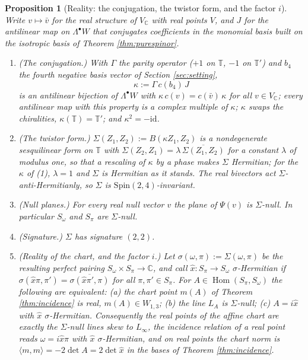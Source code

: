 \documentclass[11pt]{article}
\newtheorem{proposition}[theorem]{Proposition}
\theoremstyle{definition}
\newcommand{\C}{\mathbb{C}}
\newcommand{\T}{\mathbb{T}}
\newcommand{\id}{\mathrm{id}}
\newcommand{\ip}[2]{\langle #1, #2\rangle}
\newcommand{\Som}{S_\omega}
\newcommand{\Spi}{S_\pi}
\begin{document}
\begin{proposition}[Reality: the conjugation, the twistor form, and the factor $i$]\label{prop:reality}
Write $v \mapsto \bar v$ for the real structure of $V_\C$ with real points $V$, and $J$ for the antilinear map on $\Lambda^\bullet W$ that conjugates coefficients in the monomial basis built on the isotropic basis of Theorem \ref{thm:purespinor}.
\begin{enumerate}
\item (\emph{The conjugation.}) With $\Gamma$ the parity operator ($+1$ on $\T$, $-1$ on $\T'$) and $b_4$ the fourth negative basis vector of Section \ref{sec:setting},
\[
\kappa := \Gamma\, c(b_4)\, J
\]
is an antilinear bijection of $\Lambda^\bullet W$ with $\kappa\, c(v) = c(\bar v)\, \kappa$ for all $v \in V_\C$; every antilinear map with this property is a complex multiple of $\kappa$; $\kappa$ swaps the chiralities, $\kappa(\T) = \T'$; and $\kappa^2 = -\id$.
\item (\emph{The twistor form.}) $\Sigma(Z_1, Z_2) := B(\kappa Z_1, Z_2)$ is a nondegenerate sesquilinear form on $\T$ with $\Sigma(Z_2, Z_1) = \lambda\,\overline{\Sigma(Z_1, Z_2)}$ for a constant $\lambda$ of modulus one, so that a rescaling of $\kappa$ by a phase makes $\Sigma$ Hermitian; for the $\kappa$ of (1), $\lambda = 1$ and $\Sigma$ is Hermitian as it stands. The real bivectors act $\Sigma$-anti-Hermitianly, so $\Sigma$ is $\mathrm{Spin}(2,4)$-invariant.
\item (\emph{Null planes.}) For every real null vector $v$ the plane of $\Psi(v)$ is $\Sigma$-null. In particular $\Som$ and $\Spi$ are $\Sigma$-null.
\item (\emph{Signature.}) $\Sigma$ has signature $(2,2)$.
\item (\emph{Reality of the chart, and the factor $i$.}) Let $\sigma(\omega, \pi) := \Sigma(\omega, \pi)$ be the resulting perfect pairing $\Som\times\Spi \to \C$, and call $\hat x: \Spi\to\Som$ \emph{$\sigma$-Hermitian} if $\sigma(\hat x\pi, \pi') = \overline{\sigma(\hat x\pi', \pi)}$ for all $\pi, \pi' \in \Spi$. For $A \in \operatorname{Hom}(\Spi, \Som)$ the following are equivalent: (a) the chart point $m(A)$ of Theorem \ref{thm:incidence} is real, $m(A) \in W_{1,3}$; (b) the line $L_A$ is $\Sigma$-null; (c) $A = i\hat x$ with $\hat x$ $\sigma$-Hermitian. Consequently the real points of the affine chart are exactly the $\Sigma$-null lines skew to $L_\infty$, the incidence relation of a real point reads $\omega = i\hat x\pi$ with $\hat x$ $\sigma$-Hermitian, and on real points the chart norm is $\ip{m}{m} = -2\det A = 2\det\hat x$ in the bases of Theorem \ref{thm:incidence}.
\end{enumerate}
\end{proposition}
\end{document}
